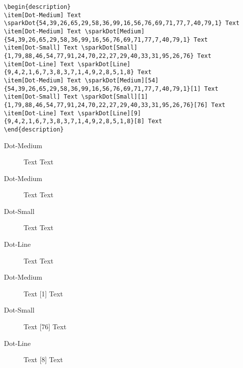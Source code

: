 \documentclass[11pt]{article}
\begin{document}
\footnotesize
\begin{verbatim}
\begin{description}
\item[Dot-Medium] Text \sparkDot{54,39,26,65,29,58,36,99,16,56,76,69,71,77,7,40,79,1} Text
\item[Dot-Medium] Text \sparkDot[Medium]{54,39,26,65,29,58,36,99,16,56,76,69,71,77,7,40,79,1} Text
\item[Dot-Small] Text \sparkDot[Small]{1,79,88,46,54,77,91,24,70,22,27,29,40,33,31,95,26,76} Text
\item[Dot-Line] Text \sparkDot[Line]{9,4,2,1,6,7,3,8,3,7,1,4,9,2,8,5,1,8} Text
\item[Dot-Medium] Text \sparkDot[Medium][54]{54,39,26,65,29,58,36,99,16,56,76,69,71,77,7,40,79,1}[1] Text
\item[Dot-Small] Text \sparkDot[Small][1]{1,79,88,46,54,77,91,24,70,22,27,29,40,33,31,95,26,76}[76] Text
\item[Dot-Line] Text \sparkDot[Line][9]{9,4,2,1,6,7,3,8,3,7,1,4,9,2,8,5,1,8}[8] Text
\end{description}
\end{verbatim}

\normalsize
\begin{description}
\item[Dot-Medium] Text  Text
\item[Dot-Medium] Text  Text
\item[Dot-Small] Text  Text
\item[Dot-Line] Text  Text
\item[Dot-Medium] Text [1] Text
\item[Dot-Small] Text [76] Text
\item[Dot-Line] Text [8] Text
\end{description}


\nocite{*}
\printbibliography
\end{document}
